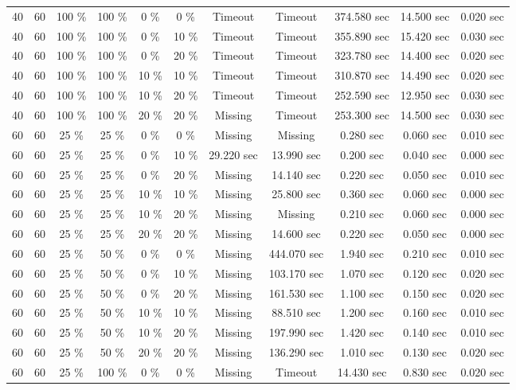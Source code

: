\documentclass{article}
\begin{document}
\begin{longtable}[]{@{}ccccccccccc@{}}
40 & 60 & 100 \% & 100 \% & 0 \% & 0 \% & Timeout & Timeout & 374.580 sec & 14.500 sec & 0.020 sec \\
40 & 60 & 100 \% & 100 \% & 0 \% & 10 \% & Timeout & Timeout & 355.890 sec & 15.420 sec & 0.030 sec \\
40 & 60 & 100 \% & 100 \% & 0 \% & 20 \% & Timeout & Timeout & 323.780 sec & 14.400 sec & 0.020 sec \\
40 & 60 & 100 \% & 100 \% & 10 \% & 10 \% & Timeout & Timeout & 310.870 sec & 14.490 sec & 0.020 sec \\
40 & 60 & 100 \% & 100 \% & 10 \% & 20 \% & Timeout & Timeout & 252.590 sec & 12.950 sec & 0.030 sec \\
40 & 60 & 100 \% & 100 \% & 20 \% & 20 \% & Missing & Timeout & 253.300 sec & 14.500 sec & 0.030 sec \\
60 & 60 & 25 \% & 25 \% & 0 \% & 0 \% & Missing & Missing & 0.280 sec & 0.060 sec & 0.010 sec \\
60 & 60 & 25 \% & 25 \% & 0 \% & 10 \% & 29.220 sec & 13.990 sec & 0.200 sec & 0.040 sec & 0.000 sec \\
60 & 60 & 25 \% & 25 \% & 0 \% & 20 \% & Missing & 14.140 sec & 0.220 sec & 0.050 sec & 0.010 sec \\
60 & 60 & 25 \% & 25 \% & 10 \% & 10 \% & Missing & 25.800 sec & 0.360 sec & 0.060 sec & 0.000 sec \\
60 & 60 & 25 \% & 25 \% & 10 \% & 20 \% & Missing & Missing & 0.210 sec & 0.060 sec & 0.000 sec \\
60 & 60 & 25 \% & 25 \% & 20 \% & 20 \% & Missing & 14.600 sec & 0.220 sec & 0.050 sec & 0.000 sec \\
60 & 60 & 25 \% & 50 \% & 0 \% & 0 \% & Missing & 444.070 sec & 1.940 sec & 0.210 sec & 0.010 sec \\
60 & 60 & 25 \% & 50 \% & 0 \% & 10 \% & Missing & 103.170 sec & 1.070 sec & 0.120 sec & 0.020 sec \\
60 & 60 & 25 \% & 50 \% & 0 \% & 20 \% & Missing & 161.530 sec & 1.100 sec & 0.150 sec & 0.020 sec \\
60 & 60 & 25 \% & 50 \% & 10 \% & 10 \% & Missing & 88.510 sec & 1.200 sec & 0.160 sec & 0.010 sec \\
60 & 60 & 25 \% & 50 \% & 10 \% & 20 \% & Missing & 197.990 sec & 1.420 sec & 0.140 sec & 0.010 sec \\
60 & 60 & 25 \% & 50 \% & 20 \% & 20 \% & Missing & 136.290 sec & 1.010 sec & 0.130 sec & 0.020 sec \\
60 & 60 & 25 \% & 100 \% & 0 \% & 0 \% & Missing & Timeout & 14.430 sec & 0.830 sec & 0.020 sec \\

\end{longtable}
\end{document}
